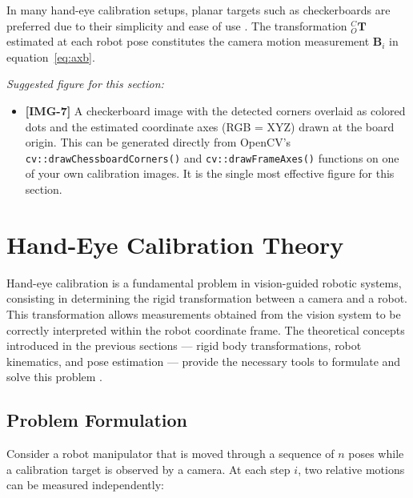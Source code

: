 In many hand-eye calibration setups, planar targets such as checkerboards are
preferred due to their simplicity and ease of use \cite{zhang2000flexible,
enebuse2021comparative}. The transformation ${}^C_O\mathbf{T}$ estimated at each
robot pose constitutes the camera motion measurement $\mathbf{B}_i$ in
equation~\eqref{eq:axb}.

\bigskip
\noindent\textit{Suggested figure for this section:}
\begin{itemize}
    \item \textbf{[IMG-7]} A checkerboard image with the detected corners
    overlaid as colored dots and the estimated coordinate axes (RGB = XYZ)
    drawn at the board origin. This can be generated directly from OpenCV's
    \texttt{cv::drawChessboardCorners()} and
    \texttt{cv::drawFrameAxes()} functions on one of your own calibration
    images. It is the single most effective figure for this section.
\end{itemize}




\section{Hand-Eye Calibration Theory}
\label{sec:hec_theory}

Hand-eye calibration is a fundamental problem in vision-guided robotic systems,
consisting in determining the rigid transformation between a camera and a robot.
This transformation allows measurements obtained from the vision system to be
correctly interpreted within the robot coordinate frame. The theoretical concepts
introduced in the previous sections — rigid body transformations, robot
kinematics, and pose estimation — provide the necessary tools to formulate and
solve this problem \cite{shiu1989calibration, tsai1989new, horaud1995hand}.

\subsection{Problem Formulation}
\label{subsec:hec_formulation}

Consider a robot manipulator that is moved through a sequence of $n$ poses while
a calibration target is observed by a camera. At each step $i$, two relative
motions can be measured independently:

